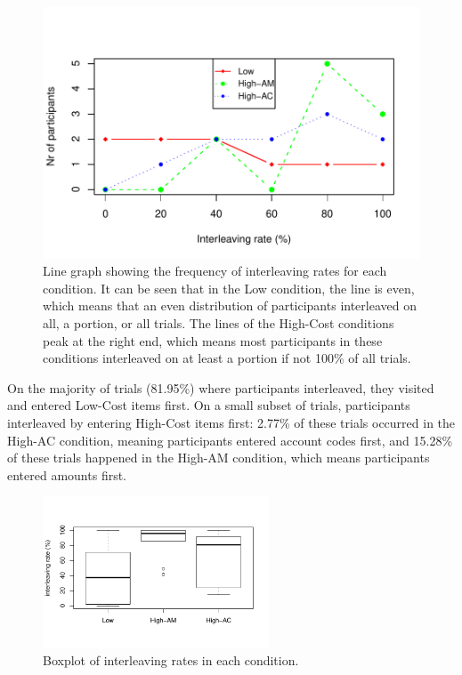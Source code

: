 \begin{figure}
 \includegraphics[width=\textwidth]{images/ch34/ch34-5_linechart.pdf}
\caption[Study 5 frequency of interleaving rates]{Line graph showing the frequency of interleaving rates for each condition. It can be seen that in the Low condition, the line is even, which means that an even distribution of participants interleaved on all, a portion, or all trials. The lines of the High-Cost conditions peak at the right end, which means most participants in these conditions interleaved on at least a portion if not 100\% of all trials.}
\label{fig:ch34_5-linechart}
\end{figure}

On the majority of trials (81.95\%) where participants interleaved, they visited and entered Low-Cost items first. On a small subset of trials, participants interleaved by entering High-Cost items first: 2.77\% of these trials occurred in the High-AC condition, meaning participants entered account codes first, and 15.28\% of these trials happened in the High-AM condition, which means participants entered amounts first. 

\begin{figure}
 \includegraphics[width=0.6\textwidth]{images/ch34/ch4_5-boxplot.pdf}
\caption[Study 5 boxplot of interleaving rates]{Boxplot of interleaving rates in each condition.}
\label{fig:ch34_5-boxplots}
\end{figure}


